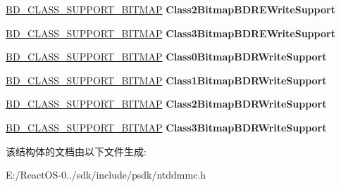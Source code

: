 \begin{DoxyCompactItemize}
\item 
\mbox{\label{struct___f_e_a_t_u_r_e___b_d___w_r_i_t_e_a0a4a919731754472ef238679eadcfef3}} 
\hyperlink{struct___b_d___c_l_a_s_s___s_u_p_p_o_r_t___b_i_t_m_a_p}{B\+D\+\_\+\+C\+L\+A\+S\+S\+\_\+\+S\+U\+P\+P\+O\+R\+T\+\_\+\+B\+I\+T\+M\+AP} {\bfseries Class2\+Bitmap\+B\+D\+R\+E\+Write\+Support}
\item 
\mbox{\label{struct___f_e_a_t_u_r_e___b_d___w_r_i_t_e_a4db4e754475dd0803e647b3b031e6d82}} 
\hyperlink{struct___b_d___c_l_a_s_s___s_u_p_p_o_r_t___b_i_t_m_a_p}{B\+D\+\_\+\+C\+L\+A\+S\+S\+\_\+\+S\+U\+P\+P\+O\+R\+T\+\_\+\+B\+I\+T\+M\+AP} {\bfseries Class3\+Bitmap\+B\+D\+R\+E\+Write\+Support}
\item 
\mbox{\label{struct___f_e_a_t_u_r_e___b_d___w_r_i_t_e_adc782a09030790c3aaabb970304e00c6}} 
\hyperlink{struct___b_d___c_l_a_s_s___s_u_p_p_o_r_t___b_i_t_m_a_p}{B\+D\+\_\+\+C\+L\+A\+S\+S\+\_\+\+S\+U\+P\+P\+O\+R\+T\+\_\+\+B\+I\+T\+M\+AP} {\bfseries Class0\+Bitmap\+B\+D\+R\+Write\+Support}
\item 
\mbox{\label{struct___f_e_a_t_u_r_e___b_d___w_r_i_t_e_aface4b7f187754c4aad27a66c7df080d}} 
\hyperlink{struct___b_d___c_l_a_s_s___s_u_p_p_o_r_t___b_i_t_m_a_p}{B\+D\+\_\+\+C\+L\+A\+S\+S\+\_\+\+S\+U\+P\+P\+O\+R\+T\+\_\+\+B\+I\+T\+M\+AP} {\bfseries Class1\+Bitmap\+B\+D\+R\+Write\+Support}
\item 
\mbox{\label{struct___f_e_a_t_u_r_e___b_d___w_r_i_t_e_a5e09725115eaab5d7d99abab0df03974}} 
\hyperlink{struct___b_d___c_l_a_s_s___s_u_p_p_o_r_t___b_i_t_m_a_p}{B\+D\+\_\+\+C\+L\+A\+S\+S\+\_\+\+S\+U\+P\+P\+O\+R\+T\+\_\+\+B\+I\+T\+M\+AP} {\bfseries Class2\+Bitmap\+B\+D\+R\+Write\+Support}
\item 
\mbox{\label{struct___f_e_a_t_u_r_e___b_d___w_r_i_t_e_a783512603427a5d678f5d49f42123aaa}} 
\hyperlink{struct___b_d___c_l_a_s_s___s_u_p_p_o_r_t___b_i_t_m_a_p}{B\+D\+\_\+\+C\+L\+A\+S\+S\+\_\+\+S\+U\+P\+P\+O\+R\+T\+\_\+\+B\+I\+T\+M\+AP} {\bfseries Class3\+Bitmap\+B\+D\+R\+Write\+Support}
\end{DoxyCompactItemize}


该结构体的文档由以下文件生成\+:\begin{DoxyCompactItemize}
\item 
E\+:/\+React\+O\+S-\/0../sdk/include/psdk/ntddmmc.\+h\end{DoxyCompactItemize}
